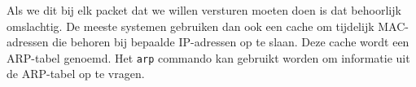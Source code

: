 Als we dit bij elk packet dat we willen versturen moeten doen is dat behoorlijk omslachtig. De meeste systemen gebruiken dan ook een cache om tijdelijk MAC-adressen die behoren bij bepaalde IP-adressen op te slaan. Deze cache wordt een ARP-tabel genoemd. Het \texttt{arp} commando kan gebruikt worden om informatie uit de ARP-tabel op te vragen.

